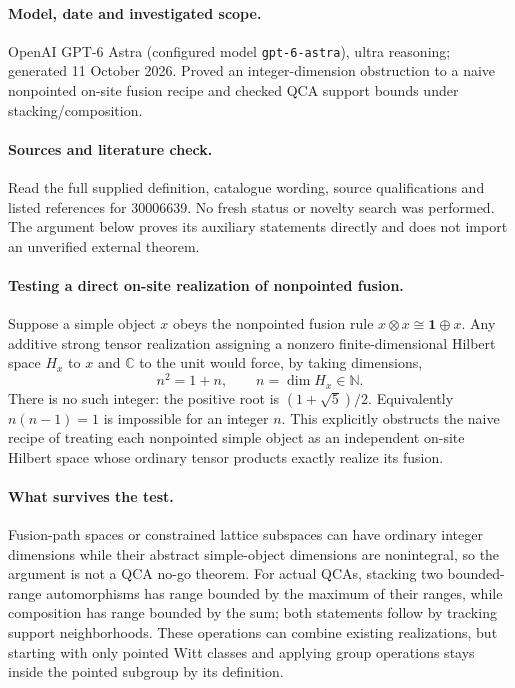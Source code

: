 \documentclass[11pt]{article}
\begin{document}
\paragraph{Model, date and investigated scope.}
OpenAI GPT-6 Astra (configured model \texttt{gpt-6-astra}), ultra reasoning; generated 11 October 2026. Proved an integer-dimension obstruction to a naive nonpointed on-site fusion recipe and checked QCA support bounds under stacking/composition.

\paragraph{Sources and literature check.}
Read the full supplied definition, catalogue wording, source qualifications and listed references for 30006639. No fresh status or novelty search was performed. The argument below proves its auxiliary statements directly and does not import an unverified external theorem.

\paragraph{Testing a direct on-site realization of nonpointed fusion.} Suppose a simple object \(x\) obeys the nonpointed fusion rule \(x\otimes x\cong\mathbf1\oplus x\). Any additive strong tensor realization assigning a nonzero finite-dimensional Hilbert space \(H_x\) to \(x\) and \(\mathbb C\) to the unit would force, by taking dimensions,
\[
 n^2=1+n,\qquad n=\dim H_x\in\mathbb N.
\]
There is no such integer: the positive root is \((1+\sqrt5)/2\). Equivalently \(n(n-1)=1\) is impossible for an integer \(n\). This explicitly obstructs the naive recipe of treating each nonpointed simple object as an independent on-site Hilbert space whose ordinary tensor products exactly realize its fusion.
\paragraph{What survives the test.} Fusion-path spaces or constrained lattice subspaces can have ordinary integer dimensions while their abstract simple-object dimensions are nonintegral, so the argument is not a QCA no-go theorem. For actual QCAs, stacking two bounded-range automorphisms has range bounded by the maximum of their ranges, while composition has range bounded by the sum; both statements follow by tracking support neighborhoods. These operations can combine existing realizations, but starting with only pointed Witt classes and applying group operations stays inside the pointed subgroup by its definition.
\end{document}

